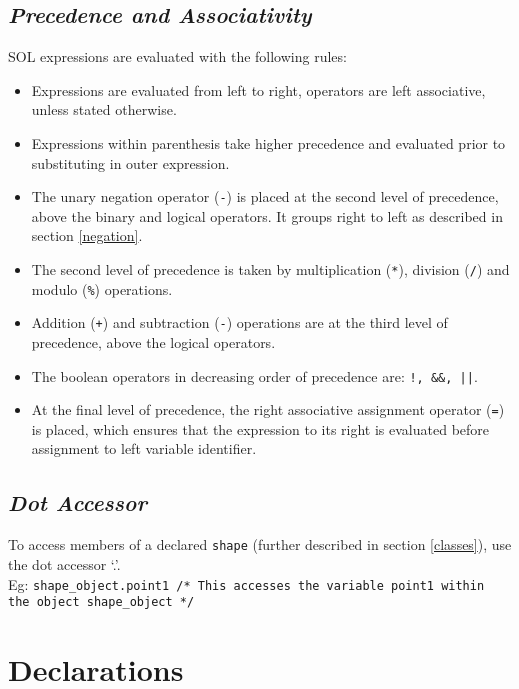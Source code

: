 \documentclass[letterpaper,12pt]{article}
\begin{document}
	\subsection{\textit{Precedence and Associativity}}
	SOL expressions are evaluated with the following rules:
	\begin{itemize}
		\itemsep0em
		\item Expressions are evaluated from left to right, operators are left associative, unless stated otherwise.

        \item Expressions within parenthesis take higher precedence and evaluated prior to substituting in outer expression.
        
        \item The unary negation operator (\texttt{-}) is placed at the second level of precedence, above the binary and logical operators. It groups right to left as described in section \ref{negation}.
		
        \item The second level of precedence is taken by multiplication (\texttt{*}), division (\texttt{/}) and modulo (\texttt{\%}) operations.
        
        \item Addition (\texttt{+}) and subtraction (\texttt{-}) operations are at the third level of precedence, above the logical operators.
		
        \item The boolean operators in decreasing order of precedence are: \texttt{!, \&\&, ||}.

        \item At the final level of precedence, the right associative assignment operator (\texttt{=}) is placed, which ensures that the expression to its right is evaluated before assignment to left variable identifier.

	\end{itemize}
	
	\subsection{\textit{Dot Accessor}}
	To access members of a declared \texttt{shape} (further described in section \ref{classes}), use the dot accessor `.'. \\
	Eg: \texttt{shape\_object.point1 /* This accesses the variable point1 within the object shape\_object */}


\section{Declarations}
\end{document}
